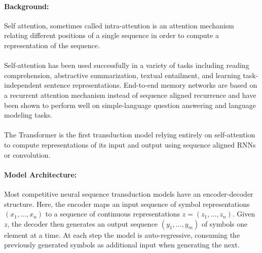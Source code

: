 \documentclass{article}
\begin{document}
\paragraph{Background:}Self attention, sometimes called intra-attention is an attention
mechanism relating different positions of a single sequence in order to compute
a representation of the sequence.

\paragraph{}Self-attention has been used successfully in a variety of tasks including reading 
comprehension, abstractive summarization, textual entailment, and learning task-independent
sentence representations. End-to-end memory networks are based on a recurrent attention mechanism
instead of sequence aligned recurrence and have been shown to perform well on simple-language 
question answering and language modeling tasks.

\paragraph{}The Transformer is the first transduction model relying entirely on self-attention to 
compute representations of its input and output using sequence aligned RNNs or convolution.

\paragraph{Model Architecture:}Most competitive neural sequence transduction models have an encoder-decoder
structure. Here, the encoder maps an input sequence of symbol representations $(x_1, \ldots, x_n)$ to a 
sequence of continuous representations $z = (z_1, \ldots, z_n)$. Given $z$, the decoder then
generates an output sequence $(y_1,\ldots, y_m)$ of symbols one element at a time. At each step
the model is auto-regressive, consuming the previously generated symbols as additional input when generating
the next.
\end{document}
